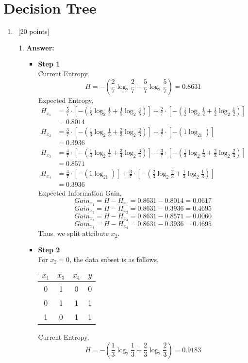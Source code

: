 \documentclass[12pt, fullpage,letterpaper]{article}
\begin{document}
\section{Decision Tree}
\begin{enumerate}
\item~[20 points]
\begin{enumerate}
\item \textbf{Answer:}
\begin{itemize}
\item \textbf{Step 1}\\
Current Entropy,
$$H=-(\frac{2}{7}\log_2\frac{2}{7}+\frac{5}{7}\log_2\frac{5}{7})=0.8631$$
Expected Entropy,
\begin{align*}
H_{x_1}&=\frac{5}{7} \cdot [-(\frac{1}{5}\log_2\frac{1}{5}+\frac{4}{5}\log_2\frac{4}{5})] + \frac{2}{7} \cdot [-(\frac{1}{2}\log_2\frac{1}{2}+\frac{1}{2}\log_2\frac{1}{2})]\\
&=0.8014\\
H_{x_2}&=\frac{3}{7} \cdot [-(\frac{1}{3}\log_2\frac{1}{3}+\frac{2}{3}\log_2\frac{2}{3})] + \frac{4}{7} \cdot [-(1\log_21)]\\
&=0.3936\\
H_{x_3}&=\frac{4}{7} \cdot [-(\frac{1}{4}\log_2\frac{1}{4}+\frac{3}{4}\log_2\frac{3}{4})] + \frac{3}{7} \cdot [-(\frac{1}{3}\log_2\frac{1}{3}+\frac{2}{3}\log_2\frac{2}{3})]\\
&=0.8571\\
H_{x_4}&=\frac{4}{7} \cdot [-(1\log_21)] + \frac{3}{7} \cdot [-(\frac{2}{3}\log_2\frac{2}{3}+\frac{1}{3}\log_2\frac{1}{3})]\\
&=0.3936
\end{align*}
Expected Information Gain,
$$Gain_{x_1}=H-H_{x_1}=0.8631-0.8014=0.0617$$
$$Gain_{x_2}=H-H_{x_2}=0.8631-0.3936=0.4695$$
$$Gain_{x_3}=H-H_{x_3}=0.8631-0.8571=0.0060$$
$$Gain_{x_4}=H-H_{x_4}=0.8631-0.3936=0.4695$$
Thus, we split attribute $x_2$.
\item \textbf{Step 2}\\
For $x_2=0$, the data subset is as follows,
\begin{table}[H]
\centering
\begin{tabular}{ccc|c}
$x_1$&$x_3$&$x_4$&$y$\\
\hline \hline
0&1&0&0\\
0&1&1&1\\
1&0&1&1\\
\end{tabular}
\end{table}
Current Entropy,
$$H=-(\frac{1}{3}\log_2\frac{1}{3}+\frac{2}{3}\log_2\frac{2}{3})=0.9183$$

\end{itemize}
\end{enumerate}
\end{enumerate}
\end{document}
